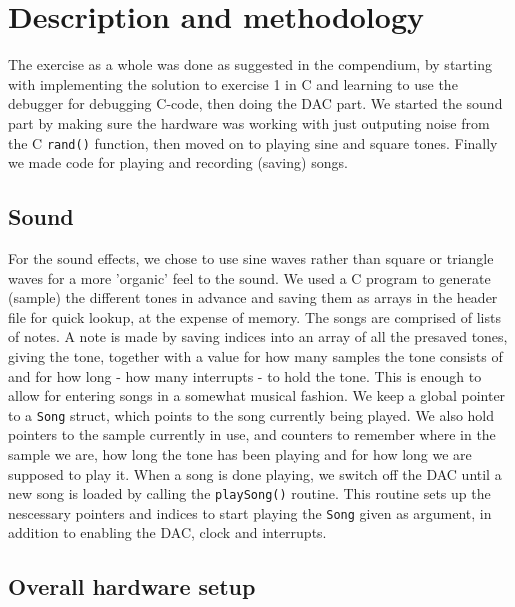 \section{Description and methodology}

The exercise as a whole was done as suggested in the compendium, by starting with implementing the solution to exercise 1 in C and learning to use the debugger for debugging C-code, then doing the DAC part. 
We started the sound part by making sure the hardware was working with just outputing noise from the C \texttt{rand()} function, then moved on to playing sine and square tones.
Finally we made code for playing and recording (saving) songs.

\subsection{Sound}
For the sound effects, we chose to use sine waves rather than square or triangle waves for a more 'organic' feel to the sound. We used a C program to generate (sample) the different tones in advance and saving them as arrays in the header file for quick lookup, at the expense of memory.
The songs are comprised of lists of notes. A note is made by saving indices into an array of all the presaved tones, giving the tone, together with a value for how many samples the tone consists of and for how long - how many interrupts - to hold the tone. 
This is enough to allow for entering songs in a somewhat musical fashion. We keep a global pointer to a \texttt{Song} struct, which points to the song currently being played. We also hold pointers to the sample currently in use, and counters to remember where in the sample we are, how long the tone has been playing and for how long we are supposed to play it.
When a song is done playing, we switch off the DAC until a new song is loaded by calling the \texttt{playSong()} routine. This routine sets up the nescessary pointers and indices to start playing the \texttt{Song} given as argument, in addition to enabling the DAC, clock and interrupts.
\subsection{Overall hardware setup}

